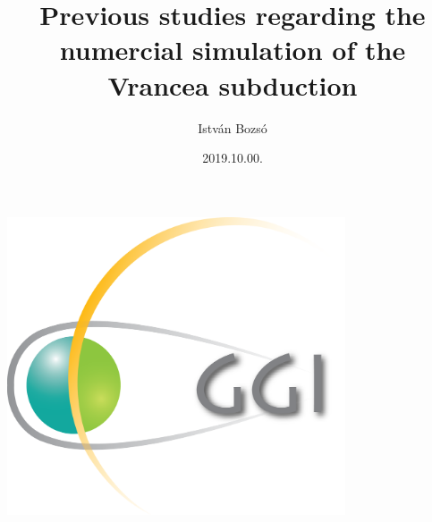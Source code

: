 \documentclass{beamer}
\title[GGI, Sopron 2019]{Previous studies regarding the numercial simulation of
                         the Vrancea subduction}
\author[István Bozsó]{István Bozsó}
\institute[MTA CSFK GGI]{MTA CSFK Geodetic and Geophysical Institute}
\date{2019.10.00.}
\begin{document}
\begin{frame}
    \titlepage
    \begin{center}
        \begin{minipage}[c]{0.3\textwidth}
            \includegraphics[width=0.75\textwidth]{ggi_logo.png}
        \end{minipage}
    \end{center}
\end{frame}


\def\ft{Introduction}
\end{document}
